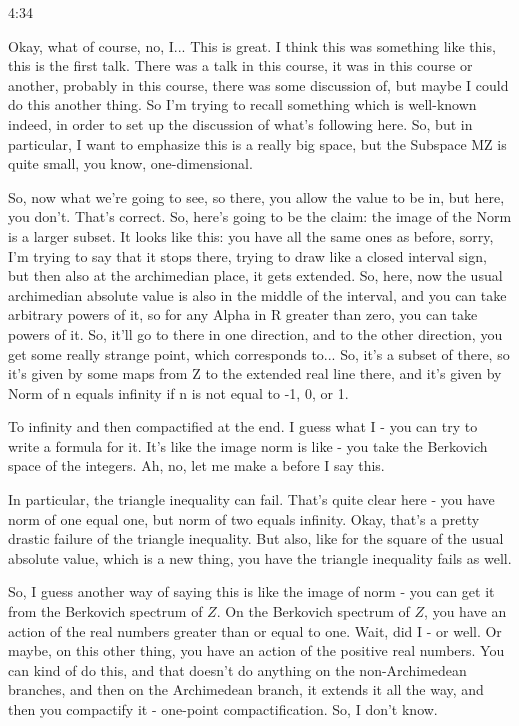 \begin{unfinished}{4:34}
\begin{example}
\begin{example}
\begin{example}
Okay, what of course, no, I... This is great. I think this was something like this, this is the first talk. There was a talk in this course, it was in this course or another, probably in this course, there was some discussion of, but maybe I could do this another thing. So I'm trying to recall something which is well-known indeed, in order to set up the discussion of what's following here. So, but in particular, I want to emphasize this is a really big space, but the Subspace MZ is quite small, you know, one-dimensional.

So, now what we're going to see, so there, you allow the value to be in, but here, you don't. That's correct. So, here's going to be the claim: the image of the Norm is a larger subset. It looks like this: you have all the same ones as before, sorry, I'm trying to say that it stops there, trying to draw like a closed interval sign, but then also at the archimedian place, it gets extended. So, here, now the usual archimedian absolute value is also in the middle of the interval, and you can take arbitrary powers of it, so for any Alpha in R greater than zero, you can take powers of it. So, it'll go to there in one direction, and to the other direction, you get some really strange point, which corresponds to... So, it's a subset of there, so it's given by some maps from Z to the extended real line there, and it's given by Norm of n equals infinity if n is not equal to -1, 0, or 1.

To infinity and then compactified at the end. I guess what I - you can try to write a formula for it. It's like the image norm is like - you take the Berkovich space of the integers. Ah, no, let me make a before I say this.

In particular, the triangle inequality can fail. That's quite clear here - you have norm of one equal one, but norm of two equals infinity. Okay, that's a pretty drastic failure of the triangle inequality. But also, like for the square of the usual absolute value, which is a new thing, you have the triangle inequality fails as well.

So, I guess another way of saying this is like the image of norm - you can get it from the Berkovich spectrum of $Z$. On the Berkovich spectrum of $Z$, you have an action of the real numbers greater than or equal to one. Wait, did I - or well. Or maybe, on this other thing, you have an action of the positive real numbers. You can kind of do this, and that doesn't do anything on the non-Archimedean branches, and then on the Archimedean branch, it extends it all the way, and then you compactify it - one-point compactification. So, I don't know.


\end{example}
\end{example}
\end{example}
\end{unfinished}
